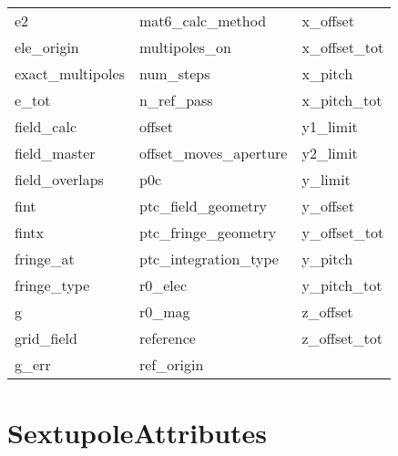 \begin{tabular}{lll}
e2                          & mat6_calc_method            & x_offset                    \\
ele_origin                  & multipoles_on               & x_offset_tot                \\
exact_multipoles            & num_steps                   & x_pitch                     \\
e_tot                       & n_ref_pass                  & x_pitch_tot                 \\
field_calc                  & offset                      & y1_limit                    \\
field_master                & offset_moves_aperture       & y2_limit                    \\
field_overlaps              & p0c                         & y_limit                     \\
fint                        & ptc_field_geometry          & y_offset                    \\
fintx                       & ptc_fringe_geometry         & y_offset_tot                \\
fringe_at                   & ptc_integration_type        & y_pitch                     \\
fringe_type                 & r0_elec                     & y_pitch_tot                 \\
g                           & r0_mag                      & z_offset                    \\
grid_field                  & reference                   & z_offset_tot                \\
g_err                       & ref_origin                  &                             \\
 \bottomrule
 \end{tabular}
 \vfill
 
 \section{SextupoleAttributes}
 \label{s:list.sextupole}
 
